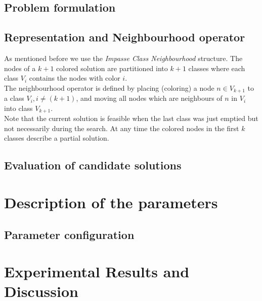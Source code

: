 \documentclass[a4paper]{scrartcl}
\begin{document}
\subsection{Problem formulation}


\subsection{Representation and Neighbourhood operator}

As mentioned before we use the \textit{Impasse Class Neighbourhood} structure.
The nodes of a $k+1$ colored solution are partitioned into $k+1$ classes where each class $V_i$ contains the nodes with color $i$.\\
The neighbourhood operator is defined by placing (coloring) a node $n \in V_{k+1}$ to a class $V_i, i \neq (k+1)$, and moving all nodes which are neighbours of $n$ in $V_i$ into class $V_{k+1}$.
\\
Note that the current solution is feasible when the last class was just emptied but not necessarily during the search. At any time the colored nodes in the first $k$ classes describe a partial solution.

\subsection{Evaluation of candidate solutions}




\section{Description of the parameters}


\subsection{Parameter configuration}

\section{Experimental Results and Discussion}









\end{document}
